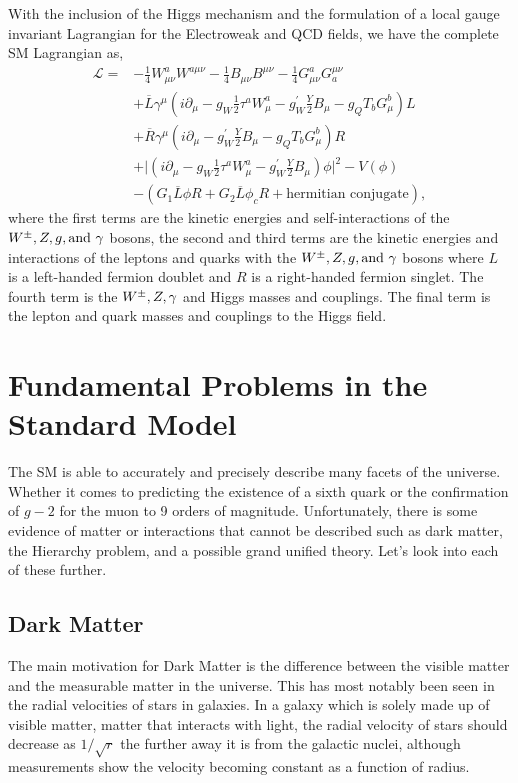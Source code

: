 With the inclusion of the Higgs mechanism and the formulation of a local gauge invariant Lagrangian for the Electroweak and QCD fields, we have the complete SM Lagrangian as,
\begin{equation}\label{SMLagrangian}
\begin{split}
\mathcal{L}=&-\frac{1}{4}W^a_{\mu\nu}W^{a\mu\nu}-\frac{1}{4}B_{\mu\nu}B^{\mu\nu}-\frac{1}{4}G^a_{\mu\nu}G_a^{\mu\nu} \\
&+\overline{L}\gamma^\mu(i\partial_\mu-g_{W}\frac{1}{2}\tau^{a}W^{a}_{\mu}-g^{\prime}_{W}\frac{Y}{2}B_\mu-g_{Q}T_{b}G^{b}_{\mu})L \\
&+\overline{R}\gamma^\mu(i\partial_\mu-g^{\prime}_{W}\frac{Y}{2}B_\mu-g_{Q}T_{b}G^{b}_{\mu})R \\
&+\lvert(i\partial_\mu-g_{W}\frac{1}{2}\tau^{a}W^{a}_\mu-g^{\prime}_{W}\frac{Y}{2}B_\mu)\phi\lvert^2-V(\phi) \\
&-(G_1\overline{L}\phi R+G_2\overline{L}\phi_cR+\text{hermitian conjugate}),
\end{split}
\end{equation}
where the first terms are the kinetic energies and self-interactions of the $W^\pm,Z, g, \text{and } \gamma$ bosons, the second and third terms are the kinetic energies and interactions of the leptons and quarks with the $W^\pm,Z, g, \text{and } \gamma$ bosons where $L$ is a left-handed fermion doublet and $R$ is a right-handed fermion singlet. The fourth term is the $W^\pm,Z,\gamma$ and Higgs masses and couplings. The final term is the lepton and quark masses and couplings to the Higgs field.  

\section{Fundamental Problems in the Standard Model}
\label{sec:SMIssues}

The SM is able to accurately and precisely describe many facets of the universe. Whether it comes to predicting the existence of a sixth quark or the confirmation of $g - 2$ for the muon to 9 orders of magnitude. Unfortunately, there is some evidence of matter or interactions that cannot be described such as dark matter, the Hierarchy problem, and a possible grand unified theory. Let's look into each of these further.

\subsection{Dark Matter}
The main motivation for Dark Matter is the difference between the visible matter and the measurable matter in the universe. This has most notably been seen in the radial velocities of stars in galaxies. In a galaxy which is solely made up of visible matter, matter that interacts with light, the radial velocity of stars should decrease as $1/\sqrt{r}$ the further away it is from the galactic nuclei, although measurements show the velocity becoming constant as a function of radius.

